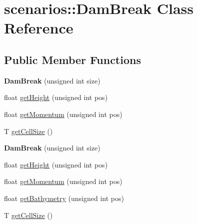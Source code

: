 \hypertarget{classscenarios_1_1DamBreak}{\section{scenarios\-:\-:Dam\-Break Class Reference}
\label{classscenarios_1_1DamBreak}
}
\subsection*{Public Member Functions}
\begin{DoxyCompactItemize}
\item 
\hypertarget{classscenarios_1_1DamBreak_a7bbd8931d94ea4f001061bde5cb0c57b}{{\bfseries Dam\-Break} (unsigned int size)}\label{classscenarios_1_1DamBreak_a7bbd8931d94ea4f001061bde5cb0c57b}

\item 
float \hyperlink{classscenarios_1_1DamBreak_adafde7d4710baeecdc4f5469cd1c6adc}{get\-Height} (unsigned int pos)
\item 
float \hyperlink{classscenarios_1_1DamBreak_a432e968cfa15a60070335d4a6c3b0da2}{get\-Momentum} (unsigned int pos)
\item 
T \hyperlink{classscenarios_1_1DamBreak_a4ca1a408aa07a2c3ac0a5613f9d06b7d}{get\-Cell\-Size} ()
\item 
\hypertarget{classscenarios_1_1DamBreak_a7bbd8931d94ea4f001061bde5cb0c57b}{{\bfseries Dam\-Break} (unsigned int size)}\label{classscenarios_1_1DamBreak_a7bbd8931d94ea4f001061bde5cb0c57b}

\item 
float \hyperlink{classscenarios_1_1DamBreak_adafde7d4710baeecdc4f5469cd1c6adc}{get\-Height} (unsigned int pos)
\item 
float \hyperlink{classscenarios_1_1DamBreak_a432e968cfa15a60070335d4a6c3b0da2}{get\-Momentum} (unsigned int pos)
\item 
float \hyperlink{classscenarios_1_1DamBreak_a7ecf0d31636f3cac3d0168f820437f18}{get\-Bathymetry} (unsigned int pos)
\item 
T \hyperlink{classscenarios_1_1DamBreak_a4ca1a408aa07a2c3ac0a5613f9d06b7d}{get\-Cell\-Size} ()
\end{DoxyCompactItemize}



